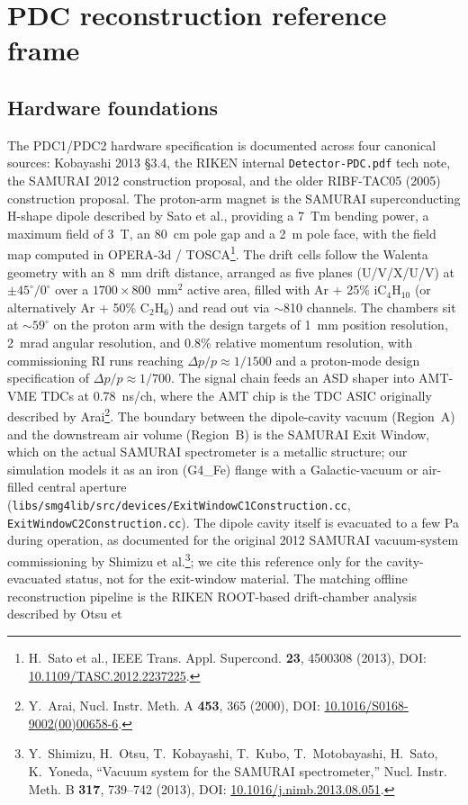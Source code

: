 \documentclass[a4paper, 11pt]{article}
\begin{document}
\section{PDC reconstruction reference frame}
\subsection{Hardware foundations}
The PDC1/PDC2 hardware specification is documented across four canonical sources: Kobayashi 2013 §3.4, the RIKEN internal \texttt{Detector-PDC.pdf} tech note, the SAMURAI 2012 construction proposal, and the older RIBF-TAC05 (2005) construction proposal. The proton-arm magnet is the SAMURAI superconducting H-shape dipole described by Sato et al., providing a 7~Tm bending power, a maximum field of 3~T, an 80~cm pole gap and a 2~m pole face, with the field map computed in OPERA-3d / TOSCA\footnote{\label{fn:sato2013}H.~Sato et al., IEEE Trans. Appl. Supercond. \textbf{23}, 4500308 (2013), DOI: \href{https://doi.org/10.1109/TASC.2012.2237225}{10.1109/TASC.2012.2237225}.}. The drift cells follow the Walenta geometry with an 8~mm drift distance, arranged as five planes (U/V/X/U/V) at $\pm 45^\circ/0^\circ$ over a $1700 \times 800$~mm$^2$ active area, filled with Ar + 25\% iC$_4$H$_{10}$ (or alternatively Ar + 50\% C$_2$H$_6$) and read out via $\sim$810 channels. The chambers sit at $\sim 59^\circ$ on the proton arm with the design targets of 1~mm position resolution, 2~mrad angular resolution, and 0.8\% relative momentum resolution, with commissioning RI runs reaching $\Delta p/p \approx 1/1500$ and a proton-mode design specification of $\Delta p/p \approx 1/700$. The signal chain feeds an ASD shaper into AMT-VME TDCs at 0.78~ns/ch, where the AMT chip is the TDC ASIC originally described by Arai\footnote{\label{fn:arai2000}Y.~Arai, Nucl. Instr. Meth. A \textbf{453}, 365 (2000), DOI: \href{https://doi.org/10.1016/S0168-9002(00)00658-6}{10.1016/S0168-9002(00)00658-6}.}. The boundary between the dipole-cavity vacuum (Region~A) and the downstream air volume (Region~B) is the SAMURAI Exit Window, which on the actual SAMURAI spectrometer is a metallic structure; our simulation models it as an iron (G4\_Fe) flange with a Galactic-vacuum or air-filled central aperture (\texttt{libs/smg4lib/src/devices/ExitWindowC1Construction.cc}, \texttt{ExitWindowC2Construction.cc}). The dipole cavity itself is evacuated to a few Pa during operation, as documented for the original 2012 SAMURAI vacuum-system commissioning by Shimizu et al.\footnote{\label{fn:shimizu2013}Y.~Shimizu, H.~Otsu, T.~Kobayashi, T.~Kubo, T.~Motobayashi, H.~Sato, K.~Yoneda, ``Vacuum system for the SAMURAI spectrometer,'' Nucl. Instr. Meth. B \textbf{317}, 739--742 (2013), DOI: \href{https://doi.org/10.1016/j.nimb.2013.08.051}{10.1016/j.nimb.2013.08.051}.}; we cite this reference only for the cavity-evacuated status, not for the exit-window material. The matching offline reconstruction pipeline is the RIKEN ROOT-based drift-chamber analysis described by Otsu et 
\end{document}
